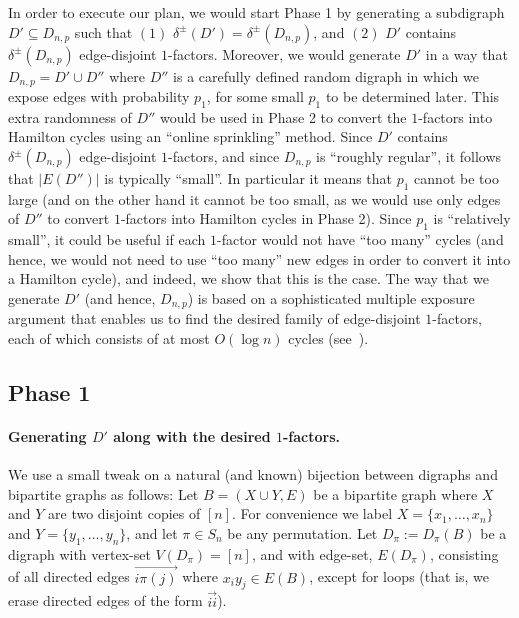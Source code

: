 \documentclass{article}
\begin{document}
	In order to execute our plan, we would start Phase 1 by generating a subdigraph $D'\subseteq D_{n,p}$ such that $(1)$ $\delta^{\pm}(D')=\delta^{\pm}(D_{n,p})$, and $(2)$ $D'$ contains $\delta^{\pm}(D_{n,p})$ edge-disjoint $1$-factors.
	Moreover, we would generate $D'$ in a way that $D_{n,p}=D'\cup D''$ where $D''$ is a carefully defined random digraph in which we expose edges with probability $p_1$, for some small $p_1$ to be determined later.
	This extra randomness of $D''$ would be used in Phase 2 to convert the $1$-factors into Hamilton cycles using an ``online sprinkling'' method.
	Since $D'$ contains $\delta^{\pm}(D_{n,p})$ edge-disjoint $1$-factors, and since $D_{n,p}$ is ``roughly regular'', it follows that $|E(D'')|$ is typically ``small''.
	In particular it means that $p_1$ cannot be too large (and on the other hand it cannot be too small, as we would use only edges of $D''$ to convert $1$-factors into Hamilton cycles in Phase 2).
	Since $p_1$ is ``relatively small'', it could be useful if each $1$-factor would not have ``too many'' cycles (and hence, we would not need to use ``too many'' new edges in order to convert it into a Hamilton cycle), and indeed, we show that this is the case.
	The way that we generate $D'$ (and hence, $D_{n,p}$) is based on a sophisticated multiple exposure argument that enables us to find the desired family of edge-disjoint $1$-factors, each of which consists of at most $O(\log n)$ cycles (see~).
	
	\subsection{Phase 1}
	\paragraph*{Generating $D'$ along with the desired $1$-factors.}
	We use a small tweak on a natural (and known) bijection between digraphs and bipartite graphs as follows:
	Let $B = (X\cup Y, E)$ be a bipartite graph where $X$ and $Y$ are two disjoint copies of $[n]$. For convenience we label $X=\{x_1,\ldots,x_n\}$ and $Y=\{y_1,\ldots,y_n\}$, and let $\pi\in S_n$ be any permutation. Let $D_{\pi}:=D_{\pi}(B)$ be a digraph with vertex-set $V(D_{\pi})=[n]$, and with edge-set, $E(D_{\pi})$, consisting of all directed edges $\overrightarrow{i\pi(j)}$ where $x_iy_j\in E(B)$, except for loops (that is, we erase directed edges of the form $\overrightarrow{ii}$).  
	
\end{document}
